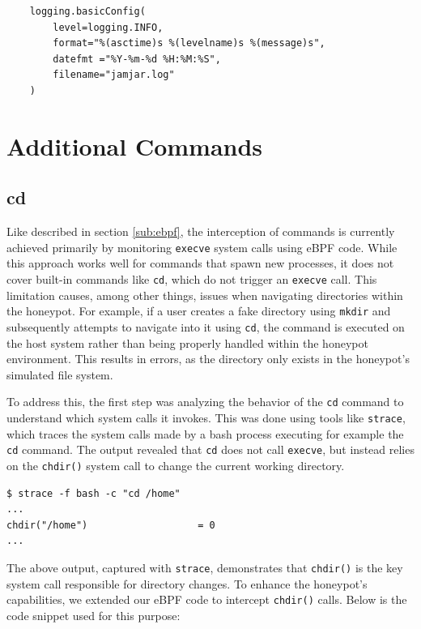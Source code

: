 \begin{lstlisting}
    logging.basicConfig(
        level=logging.INFO,
        format="%(asctime)s %(levelname)s %(message)s",
        datefmt ="%Y-%m-%d %H:%M:%S",
        filename="jamjar.log"
    )
\end{lstlisting}

\section{Additional Commands}

\subsection{cd}
\label{sub:cd}

Like described in section \ref{sub:ebpf}, the interception of commands is currently achieved primarily by monitoring \texttt{execve} system calls using eBPF code. While this approach works well for commands that spawn new processes, it does not cover built-in commands like \texttt{cd}, which do not trigger an \texttt{execve} call. This limitation causes, among other things, issues when navigating directories within the honeypot. For example, if a user creates a fake directory using \texttt{mkdir} and subsequently attempts to navigate into it using \texttt{cd}, the command is executed on the host system rather than being properly handled within the honeypot environment. This results in errors, as the directory only exists in the honeypot's simulated file system.

To address this, the first step was analyzing the behavior of the \texttt{cd} command to understand which system calls it invokes. This was done using tools like \texttt{strace}, which traces the system calls made by a bash process executing for example the \texttt{cd} command. The output revealed that \texttt{cd} does not call \texttt{execve}, but instead relies on the \texttt{chdir()} system call to change the current working directory.

\begin{lstlisting}
$ strace -f bash -c "cd /home" 
... 
chdir("/home")                   = 0
... 
\end{lstlisting}

The above output, captured with \texttt{strace}, demonstrates that \texttt{chdir()} is the key system call responsible for directory changes. To enhance the honeypot's capabilities, we extended our eBPF code to intercept \texttt{chdir()} calls. Below is the code snippet used for this purpose:

